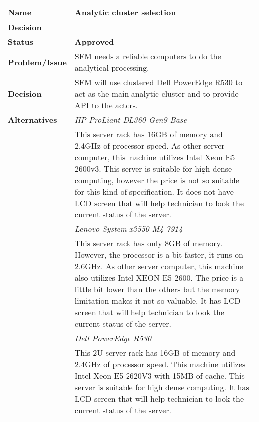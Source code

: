\begin{table}[H]
	\begin{tabular}{L{0.2\textwidth} L{0.6\textwidth}}
		\textbf{Name}           & \textbf{Analytic cluster selection} \\ \toprule
		\textbf{Decision}       & \textbf{}\\ \midrule
		\textbf{Status}         & \textbf{Approved} \\ \midrule
		\textbf{Problem/Issue}  & SFM needs a reliable computers to do the analytical processing. \\ \midrule
		\textbf{Decision}       & SFM will use clustered Dell PowerEdge R530 to act as the main analytic cluster and to provide API to the actors.\\ \midrule
		\textbf{Alternatives}   & \textit{HP ProLiant DL360 Gen9 Base}\\
		& This server rack has 16GB of memory and 2.4GHz of processor speed. As other server computer, this machine utilizes Intel Xeon E5 2600v3. This server is suitable for high dense computing, however the price is not so suitable for this kind of specification. It does not have LCD screen that will help technician to look the current status of the server.\\
		& \textit{Lenovo System x3550 M4 7914}\\
		& This server rack has only 8GB of memory. However, the processor is a bit faster, it runs on 2.6GHz. As other server computer, this machine also utilizes Intel XEON E5-2600. The price is a little bit lower than the others but the memory limitation makes it not so valuable. It has LCD screen that will help technician to look the current status of the server. \\
		& \textit{Dell PowerEdge R530} \\
		& This 2U server rack has 16GB of memory and 2.4GHz of processor speed. This machine utilizes Intel Xeon E5-2620V3 with 15MB of cache. This server is suitable for high dense computing. It has LCD screen that will help technician to look the current status of the server. \\

\end{tabular}
\end{table}
